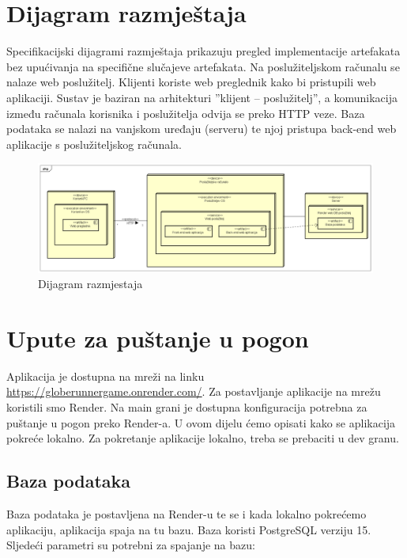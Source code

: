 		\eject


		\section{Dijagram razmještaja}

			Specifikacijski dijagrami razmještaja prikazuju pregled implementacije artefakata bez upućivanja na specifične slučajeve artefakata. Na poslužiteljskom računalu se nalaze web poslužitelj. Klijenti koriste web preglednik kako bi pristupili web aplikaciji. Sustav je baziran na arhitekturi ”klijent – poslužitelj”, a komunikacija između računala korisnika i poslužitelja odvija se preko HTTP veze. Baza podataka se nalazi na vanjskom uređaju (serveru) te njoj pristupa back-end web aplikacije s poslužiteljskog računala.
			\begin{figure}[H]
				\includegraphics[width=\textwidth]{slike/Dijagram_razmjestaja.png}
				\centering
				\caption{Dijagram razmjestaja}
				\label{fig:promjene}
			\end{figure}
			\eject

		\section{Upute za puštanje u pogon}

			Aplikacija je dostupna na mreži na linku \url{https://globerunnergame.onrender.com/}. Za postavljanje aplikacije na mrežu koristili smo Render. Na main grani je dostupna konfiguracija potrebna za puštanje u pogon preko Render-a. U ovom dijelu ćemo opisati kako se aplikacija pokreće lokalno. Za pokretanje aplikacije lokalno, treba se prebaciti u dev granu.

			\subsection{Baza podataka}

			Baza podataka je postavljena na Render-u te se i kada lokalno pokrećemo aplikaciju, aplikacija spaja na tu bazu. Baza koristi PostgreSQL verziju 15. Sljedeći parametri su potrebni za spajanje na bazu:

